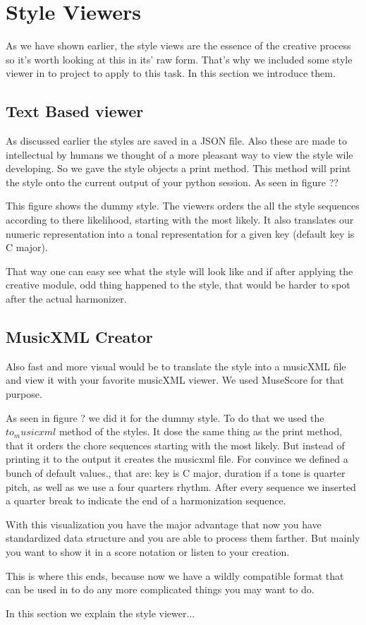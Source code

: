 \section{Style Viewers} 
As we have shown earlier, the style views are the essence of the creative process so it's worth looking at this in its' raw form. That's why we included some style viewer in to project to apply to this task. In this section we introduce them.

\subsection{Text Based viewer}
As discussed earlier the styles are saved in a JSON file. Also these are made to intellectual by humans we thought of a more pleasant way to view the style wile developing. So we gave the style objects a print method. This method will print the style onto the current output of your python session. As seen in figure ??


This figure shows the dummy style. The viewers orders the all the style sequences according to there likelihood, starting with the most likely.  It also translates our numeric representation into a tonal representation for a given key (default key is C major).

That way one can easy see what the style will look like and if after applying the creative module, odd thing happened to the style, that would be harder to spot after the actual harmonizer. 

\subsection{MusicXML Creator}
Also fast and more visual would be to translate the style into a musicXML file and view it with your favorite musicXML viewer. We used MuseScore for that purpose. 


As seen in figure ? we did it for the dummy style. To do that we used the $to_musicxml$ method of the styles. It dose the same thing as the print method, that it orders the chore sequences starting with the most likely. But instead of printing it to the output it creates the musicxml file. For convince we defined a bunch of default values., that are: key is C major, duration if a tone is quarter pitch, as well as we use a four quarters rhythm. After every sequence we inserted a quarter break to indicate the end of a harmonization sequence.

With this visualization you have the major advantage that now you have standardized data structure and you are able to process them farther. But mainly you want to show it in a score notation or listen to your creation.

This is where this ends, because now we have a wildly compatible format that can be used in to do any more complicated things you may want to do. 



In this section we explain the style viewer...